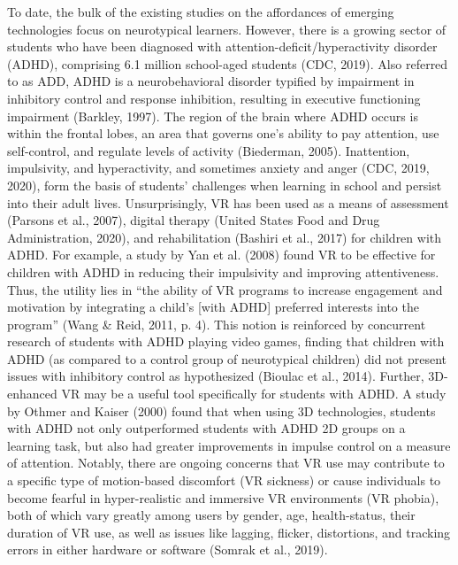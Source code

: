 \documentclass[11.5pt]{sig-alternate} %
\begin{document}
\begin{large}
To date, the bulk of the existing studies on the affordances of emerging technologies focus on neurotypical learners. However, there is a growing sector of students who have been diagnosed with attention-deficit/hyperactivity disorder (ADHD), comprising 6.1 million school-aged students (CDC, 2019). Also referred to as ADD, ADHD is a neurobehavioral disorder typified by impairment in inhibitory control and response inhibition, resulting in executive functioning impairment (Barkley, 1997). The region of the brain where ADHD occurs is within the frontal lobes, an area that governs one’s ability to pay attention, use self-control, and regulate levels of activity (Biederman, 2005). Inattention, impulsivity, and hyperactivity, and sometimes anxiety and anger (CDC, 2019, 2020), form the basis of students’ challenges when learning in school and persist into their adult lives. Unsurprisingly, VR has been used as a means of assessment (Parsons et al., 2007), digital therapy (United States Food and Drug Administration, 2020), and rehabilitation (Bashiri et al., 2017) for children with ADHD. For example, a study by Yan et al. (2008) found VR to be effective for children with ADHD in reducing their impulsivity and improving attentiveness. Thus, the utility lies in “the ability of VR programs to increase engagement and motivation by integrating a child’s [with ADHD] preferred interests into the program” (Wang \& Reid, 2011, p. 4). This notion is reinforced by concurrent research of students with ADHD playing video games, finding that children with ADHD (as compared to a control group of neurotypical children) did not present issues with inhibitory control as hypothesized (Bioulac et al., 2014). Further, 3D-enhanced VR may be a useful tool specifically for students with ADHD. A study by Othmer and Kaiser (2000) found that when using 3D technologies, students with ADHD not only outperformed students with ADHD 2D groups on a learning task, but also had greater improvements in impulse control on a measure of attention. Notably, there are ongoing concerns that VR use may contribute to a specific type of motion-based discomfort (VR sickness) or cause individuals to become fearful in hyper-realistic and immersive VR environments (VR phobia), both of which vary greatly among users by gender, age, health-status, their duration of VR use, as well as issues like lagging, flicker, distortions, and tracking errors in either hardware or software (Somrak et al., 2019). 


\end{large}
\end{document}
